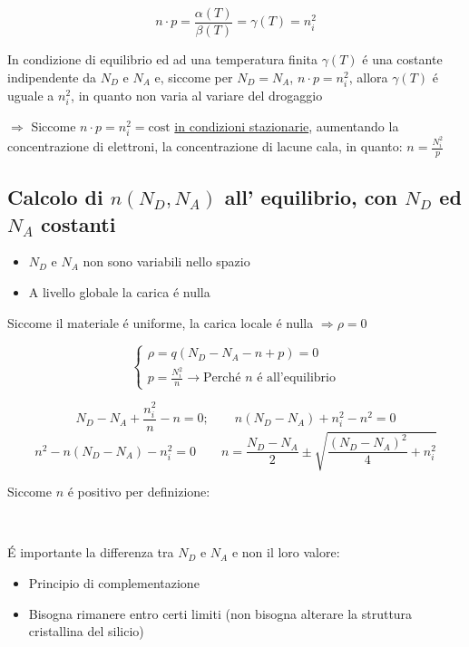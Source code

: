 \documentclass{article}
\begin{document}
\[
    n \cdot p = \frac{\alpha(T)}{\beta(T)} = \gamma(T) = n_i^2
\]

In condizione di equilibrio ed ad una temperatura finita $\gamma(T)$ \'e una costante indipendente da $N_D$ e $N_A$ e, siccome per $N_D = N_A$, $n \cdot p = n_i^2$, allora $\gamma(T)$ \'e uguale a $n_i^2$, in quanto non varia al variare del drogaggio

$\Rightarrow$ Siccome $ n \cdot p = n_i^2 = \text{cost}$ \underline{in condizioni stazionarie}, aumentando la concentrazione di elettroni, la concentrazione di lacune cala, in quanto: $n = \frac{N_i^2}{p}$

\subsection{Calcolo di $n(N_D, N_A)$ all' equilibrio, con $N_D$ ed $N_A$ costanti}
\begin{itemize}
    \item $N_D$ e $N_A$ non sono variabili nello spazio
    \item A livello globale la carica \'e nulla
\end{itemize}

Siccome il materiale \'e uniforme, la carica locale \'e nulla $\Rightarrow \rho = 0$

\[
\begin{cases*}
    \rho = q(N_D - N_A -n + p) = 0\\
    p = \frac{N_i^2}{n} \rightarrow \text{Perch\'e $n$ \'e all'equilibrio}
\end{cases*}
\]

\[
    N_D - N_A + \frac{n_i^2}{n} - n = 0; \qquad n(N_D - N_A) + n_i^2 - n^2 = 0
\]
\[
    n^2 - n(N_D - N_A) - n_i^2 = 0 \qquad n = \frac{N_D - N_A}{2} \pm \sqrt{\frac{(N_D - N_A)^2}{4} + n_i^2}
\]

Siccome $n$ \'e positivo per definizione:

\begin{center}
    \\
    \vspace{10px}
\end{center}

\'E importante la differenza tra $N_D$ e $N_A$ e non il loro valore:
\begin{itemize}
    \item Principio di complementazione
    \item Bisogna rimanere entro certi limiti (non bisogna alterare la struttura cristallina del silicio)
\end{itemize}
\end{document}

